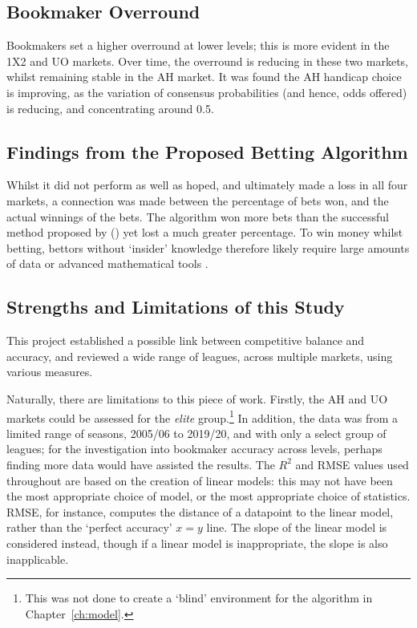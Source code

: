 \documentclass[a4paper,10pt]{report}
\begin{document}
\subsection*{Bookmaker Overround}
Bookmakers set a higher overround at lower levels; this is more evident in the 1X2 and UO markets. Over time, the overround is reducing in these two markets, whilst remaining stable in the AH market. It was found the AH handicap choice is improving, as the variation of consensus probabilities (and hence, odds offered) is reducing, and concentrating around 0.5.

\subsection*{Findings from the Proposed Betting Algorithm}
Whilst it did not perform as well as hoped, and ultimately made a loss in all four markets, a connection was made between the percentage of bets won, and the actual winnings of the bets. The algorithm won more bets than the successful method proposed by \citeauthor{kaunitz17} (\citeyear{kaunitz17}) yet lost a much greater percentage. To win money whilst betting, bettors without `insider’ knowledge therefore likely require large amounts of data \autocite{godin14} or advanced mathematical tools \autocite{dixon97, Owen09, karlis09, constantinou20}.

\subsection*{Strengths and Limitations of this Study}
This project established a possible link between competitive balance and accuracy, and reviewed a wide range of leagues, across multiple markets, using various measures.

Naturally, there are limitations to this piece of work. Firstly, the AH and UO markets could be assessed for the \textit{elite} group.\footnote{This was not done to create a `blind' environment for the algorithm in Chapter~\ref{ch:model}.} In addition, the data was from a limited range of seasons, 2005/06 to 2019/20, and with only a select group of leagues; for the investigation into bookmaker accuracy across levels, perhaps finding more data would have assisted the results. The $R^2$ and RMSE values used throughout are based on the creation of linear models: this may not have been the most appropriate choice of model, or the most appropriate choice of statistics. RMSE, for instance, computes the distance of a datapoint to the linear model, rather than the `perfect accuracy' $x=y$ line. The slope of the linear model is considered instead, though if a linear model is inappropriate, the slope is also inapplicable.
\end{document}
